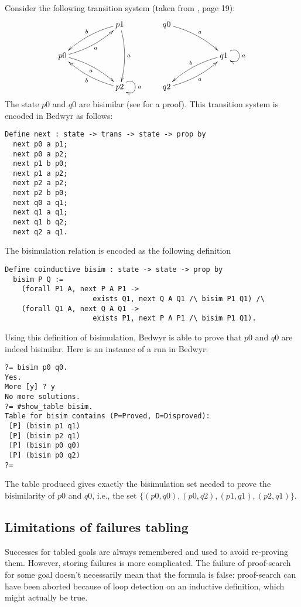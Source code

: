 Consider the following transition system (taken from \cite{milner99book},
page 19):
$$
\xymatrix{
   &  & p1 \ar@/_/[lld]_b \ar@/^/[dd]^a \\
p0 \ar@/_/[rru]_a \ar@/^/[rrd]_a \\
 & & p2 \ar@(ur,dr)^a \ar@/^/[llu]^b
}
\qquad
\xymatrix{
q0 \ar@/^/[rrd]^a \\
 & & q1 \ar@(ur,dr)^a \ar@/_/[dll]_b \\
q2 \ar@/_/[rru]_a
}
$$
The state $p0$ and $q0$ are bisimilar (see \cite{milner99book} for a proof).
This transition system is encoded in Bedwyr as follows:
\begin{verbatim}
Define next : state -> trans -> state -> prop by
  next p0 a p1;
  next p0 a p2;
  next p1 b p0;
  next p1 a p2;
  next p2 a p2;
  next p2 b p0;
  next q0 a q1;
  next q1 a q1;
  next q1 b q2;
  next q2 a q1.
\end{verbatim}
The bisimulation relation is encoded as the following definition
\begin{verbatim}
Define coinductive bisim : state -> state -> prop by
  bisim P Q :=
    (forall P1 A, next P A P1 ->
                     exists Q1, next Q A Q1 /\ bisim P1 Q1) /\
    (forall Q1 A, next Q A Q1 ->
                     exists P1, next P A P1 /\ bisim P1 Q1).
\end{verbatim}
Using this definition of bisimulation, Bedwyr is able to prove that
$p0$ and $q0$ are indeed bisimilar. Here is an instance of a run in Bedwyr:
\begin{verbatim}
?= bisim p0 q0.
Yes.
More [y] ? y
No more solutions.
?= #show_table bisim.
Table for bisim contains (P=Proved, D=Disproved):
 [P] (bisim p1 q1)
 [P] (bisim p2 q1)
 [P] (bisim p0 q0)
 [P] (bisim p0 q2)
?=
\end{verbatim}
The table produced gives exactly the bisimulation set
needed to prove the bisimilarity of $p0$ and $q0$, i.e.,
the set $\{(p0,q0), (p0, q2), (p1,q1), (p2,q1) \}.$

\subsection{Limitations of failures tabling}
\label{restrict-failures-tabling}

Successes for tabled goals are always remembered and used to avoid
re-proving them. However, storing failures is more complicated.
The failure of proof-search for some goal doesn't necessarily mean
that the formula is false: proof-search can have been aborted because
of loop detection on an inductive definition, which might actually be true.

